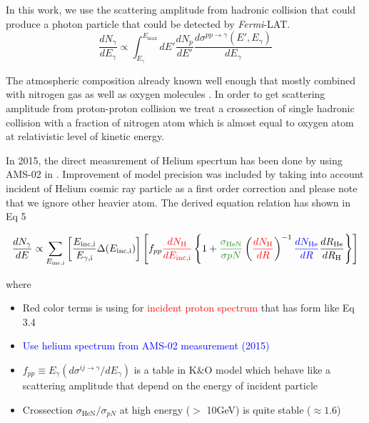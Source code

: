 In this work, we use the scattering amplitude from hadronic collision \cite{K&Omodel} that could produce a photon particle that could be detected by \textit{Fermi}-LAT.
\begin{equation}
    \frac{dN_\gamma}{dE_\gamma} \propto \int^{E_{\text{max}}}_{E_\gamma} dE'\frac{dN_p}{dE'} \frac{d\sigma^{pp\rightarrow\gamma}(E',E_\gamma)}{dE_\gamma}
\end{equation}
\par The atmospheric composition already known well enough that mostly combined with nitrogen gas as well as oxygen molecules \cite{atmosCompos}. 
In order to get scattering amplitude from proton-proton collision we treat a crossection of single hadronic collision with a fraction of nitrogen atom which is almost equal to oxygen atom \cite{WAtwater} at relativistic level of kinetic energy.
\par In 2015, the direct measurement of Helium specrtum has been done by using AMS-02 in \cite{AMS-02Helium}. Improvement of model precision was included by taking into account incident of Helium cosmic ray particle as a first order correction and please note that we ignore other heavier atom. The derived equation relation has shown in Eq 5

\begin{equation}
    \frac{dN_{\gamma}}{dE} \propto \sum_{E_{\text{inc,i}}}\left[\frac{E_{\text{inc,i}}}{E_{\gamma\text{,i}}}\Delta(E_{\text{inc,i}}) \right]\left[ f_{pp}\textcolor{red}{\frac{dN_\text{H}}{dE_{\text{inc,i}}}}\left\{ 1+\textcolor{olivegreen}{\frac{\sigma_{\text{HeN}}}{\sigma{pN}}}\left(\textcolor{red}{\frac{dN_{\text{H}}}{dR}}\right)^{-1} \textcolor{blue}{\frac{dN_{\text{He}}}{dR}} \frac{dR_{\text{He}}}{dR_{\text{H}}}  \right\}\right]
\end{equation}

where
\begin{itemize}
    \item Red color terms is using for \textcolor{red}{incident proton spectrum} that has form like Eq 3.4
    \item \textcolor{blue}{Use helium spectrum from AMS-02 measurement (2015)}
    \item $f_{pp}\equiv E_\gamma(d\sigma^{ij\rightarrow\gamma}/dE_\gamma)$ is a table in K$\&$O model which behave like a scattering amplitude
    that depend on the energy of incident particle
    \item Crossection \textcolor{olivegreen}{$\sigma_{\text{HeN}}/\sigma_{pN}$} at high energy ($>$ 10GeV) is quite stable ($\approx 1.6$)
\end{itemize}



